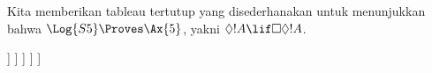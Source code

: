 \documentclass[../../../include/open-logic-section]{subfiles}
\begin{document}
\begin{ex}
  Kita memberikan tableau tertutup yang disederhanakan untuk menunjukkan
  bahwa $\Log{S5} \Proves \Ax{5}$, yakni
  $\Diamond!A \lif \Box\Diamond!A$.
  \begin{oltableau}
    [\pFmla{\False}{\Diamond\formula{A} \lif \Box\Diamond \formula{A}}{1},
      just = \TAss
      [\pFmla{\True}{\Diamond \formula{A}}{1}, just = {\TRule{\False}{\lif}[1]}
        [\pFmla{\False}{\Box\Diamond \formula{A}}{1},
          just = {\TRule{\False}{\lif}[1]}
          [\pFmla{\False}{\Diamond \formula{A}}{2},
            just = {\TRule{\False}{\Box}[3]}
            [\pFmla{\True}{\formula{A}}{3},
              just = {\TRule{\True}{\Diamond}[2]}
                [\pFmla{\False}{\formula{A}}{3},
                  just = {\TRule{\False}{\Diamond}[4]}, close]
            ]
          ]
        ]
      ]
    ]
  \end{oltableau}
\end{ex}
\end{document}
